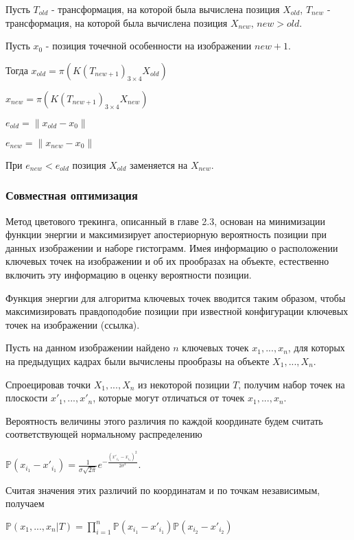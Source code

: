 Пусть $T_{old}$ - трансформация, на которой была вычислена позиция $X_{old}$,
$T_{new}$ - трансформация, на которой была вычислена позиция
$X_{new}$, $new > old$.

Пусть $x_0$ - позиция точечной особенности на изображении $new + 1$. 

Тогда $x_{old} = \pi (K (T_{new + 1})_{3 \times 4} X_{old})$

$x_{new} = \pi (K (T_{new + 1})_{3 \times 4} X_{new})$

$e_{old} = \| x_{old} - x_0 \|$

$e_{new} = \| x_{new} - x_0 \|$

При $e_{new} < e_{old}$ позиция $X_{old}$ заменяется на $X_{new}$.

\subsubsection{Совместная оптимизация}

Метод цветового трекинга, описанный в главе 2.3, основан на минимизации функции
энергии и максимизирует апостериорную вероятность позиции при данных
изображении и наборе гистограмм.
Имея информацию о расположении ключевых точек на изображении и об их прообразах
на объекте, естественно включить эту информацию в оценку вероятности позиции.

Функция энергии для алгоритма ключевых точек вводится таким образом, чтобы
максимизировать правдоподобие позиции при известной конфигурации ключевых точек
на изображении (ссылка).

Пусть на данном изображении найдено $n$ ключевых точек $x_1, ..., x_n$, для
которых на предыдущих кадрах были вычислены прообразы на объекте
$X_1, ..., X_n$. 

Спроецировав точки $X_1, ..., X_n$ из некоторой позиции $T$, получим набор
точек на плоскости $x'_1, ..., x'_n$, которые могут отличаться от точек
$x_1, ..., x_n$.

Вероятность величины этого различия по каждой координате будем считать
соответствующей нормальному распределению

$
    \mathbb{P}(x_{i_1} - x'_{i_1}) = \frac{1}{\sigma \sqrt{2 \pi}}e^{- \frac{(x'_{i_1} - x_{i_1})^2}{2 \sigma^2}}
$.

Считая значения этих различий по координатам и по точкам независимым, получаем

$
    \mathbb{P}(x_1, ..., x_n | T) = \prod\limits_{i = 1}^n \mathbb{P}(x_{i_1} - x'_{i_1})\mathbb{P}(x_{i_2} - x'_{i_2})
$

